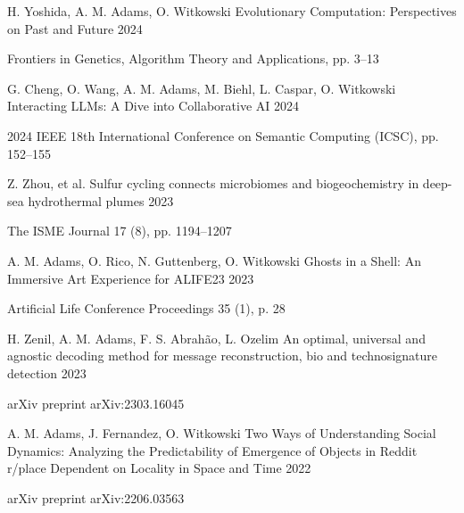 \begin{cventries}
\cventry
    {H. Yoshida, \textcolor{cmyk-magenta}{A. M. Adams}, O. Witkowski}
    {Evolutionary Computation: Perspectives on Past and Future}
    {}
    {2024}
    {
    \begin{cvitems}
        \item {Frontiers in Genetics, Algorithm Theory and Applications, pp. 3–13}
    \end{cvitems}
    }

\cventry
    {G. Cheng, O. Wang, \textcolor{cmyk-magenta}{A. M. Adams}, M. Biehl, L. Caspar, O. Witkowski}
    {Interacting LLMs: A Dive into Collaborative AI}
    {}
    {2024}
    {
    \begin{cvitems}
        \item {2024 IEEE 18th International Conference on Semantic Computing (ICSC), pp. 152–155}
    \end{cvitems}
    }

\cventry
    {Z. Zhou, et al.}
    {Sulfur cycling connects microbiomes and biogeochemistry in deep-sea hydrothermal plumes}
    {}
    {2023}
    {
    \begin{cvitems}
        \item {The ISME Journal 17 (8), pp. 1194–1207}
    \end{cvitems}
    }

\cventry
    {\textcolor{cmyk-magenta}{A. M. Adams}, O. Rico, N. Guttenberg, O. Witkowski}
    {Ghosts in a Shell: An Immersive Art Experience for ALIFE23}
    {}
    {2023}
    {
    \begin{cvitems}
        \item {Artificial Life Conference Proceedings 35 (1), p. 28}
    \end{cvitems}
    }

\cventry
    {H. Zenil, \textcolor{cmyk-magenta}{A. M. Adams}, F. S. Abrahão, L. Ozelim}
    {An optimal, universal and agnostic decoding method for message reconstruction, bio and technosignature detection}
    {}
    {2023}
    {
    \begin{cvitems}
        \item {arXiv preprint arXiv:2303.16045}
    \end{cvitems}
    }
    
\cventry
    {\textcolor{cmyk-magenta}{A. M. Adams}, J. Fernandez, O. Witkowski}
    {Two Ways of Understanding Social Dynamics: Analyzing the Predictability of Emergence of Objects in Reddit r/place Dependent on Locality in Space and Time}
    {}
    {2022}
    {
    \begin{cvitems}
        \item {arXiv preprint arXiv:2206.03563}
    \end{cvitems}
    }


\end{cventries}
